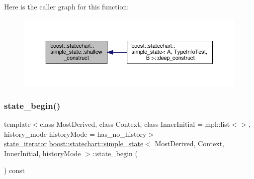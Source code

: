 Here is the caller graph for this function\+:
\nopagebreak
\begin{figure}[H]
\begin{center}
\leavevmode
\includegraphics[width=350pt]{classboost_1_1statechart_1_1simple__state_a598d677d3cf6b90001e19ef3566eca5e_icgraph}
\end{center}
\end{figure}
\mbox{\label{classboost_1_1statechart_1_1simple__state_a2884dbeb0cbc4465e5ce1955f1a655e7}} 
\subsubsection{\texorpdfstring{state\+\_\+begin()}{state\_begin()}}
{\footnotesize\ttfamily template$<$class Most\+Derived, class Context, class Inner\+Initial = mpl\+::list$<$$>$, history\+\_\+mode history\+Mode = has\+\_\+no\+\_\+history$>$ \\
\mbox{\hyperlink{classboost_1_1statechart_1_1simple__state_a32d30bbceb41ad02b70016d8530722a1}{state\+\_\+iterator}} \mbox{\hyperlink{classboost_1_1statechart_1_1simple__state}{boost\+::statechart\+::simple\+\_\+state}}$<$ Most\+Derived, Context, Inner\+Initial, history\+Mode $>$\+::state\+\_\+begin (\begin{DoxyParamCaption}{ }\end{DoxyParamCaption}) const\hspace{0.3cm}{\ttfamily [inline]}}

\mbox{\label{classboost_1_1statechart_1_1simple__state_aa94dea47fe6c47cdd5a3585be5db75a0}} 
